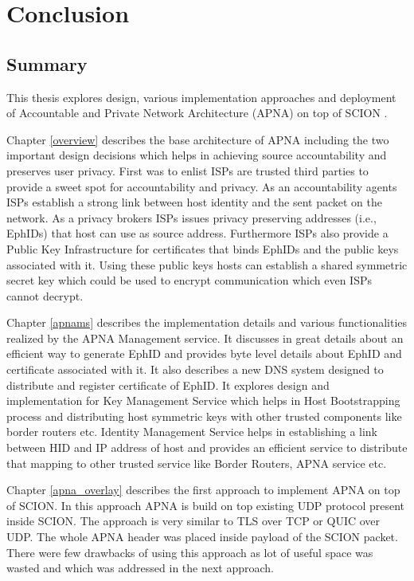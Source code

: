
\chapter{Conclusion} %

\label{conclusion}

\section{Summary}

This thesis explores design, various implementation approaches and deployment of Accountable and Private Network Architecture (APNA) on top of SCION .

Chapter \ref{overview} describes the base architecture of APNA including the two important design decisions which helps in achieving source accountability and preserves user privacy. First was to enlist ISPs are trusted third parties to provide a sweet spot for accountability and privacy. As an accountability agents ISPs establish a strong link between host identity and the sent packet on the network. As a privacy brokers ISPs issues privacy preserving addresses (i.e., EphIDs) that host can use as source address. Furthermore ISPs also provide a Public Key Infrastructure for certificates that binds EphIDs and the public keys associated with it. Using these public keys hosts can establish a shared symmetric secret key which could be used to encrypt communication which even ISPs cannot decrypt.

Chapter \ref{apnams} describes the implementation details and various  functionalities realized by the APNA Management service. It discusses in great details about an efficient way to generate EphID and provides byte level details about EphID and certificate associated with it. It also describes a new DNS system designed to distribute and register certificate of EphID. It explores design and implementation for Key Management Service which helps in Host Bootstrapping process and distributing host symmetric keys with other trusted components like border routers etc. Identity Management Service helps in establishing a link between HID and IP address of host and provides an efficient service to distribute that mapping to other trusted service like Border Routers, APNA service etc.

Chapter \ref{apna_overlay} describes the first approach to implement APNA on top of SCION. In this approach APNA is build on top existing UDP protocol present inside SCION. The approach is very similar to TLS over TCP or QUIC over UDP. The whole APNA header was placed inside payload of the SCION packet. There were few drawbacks of using this approach as lot of useful space was wasted and which was addressed in the next approach.

